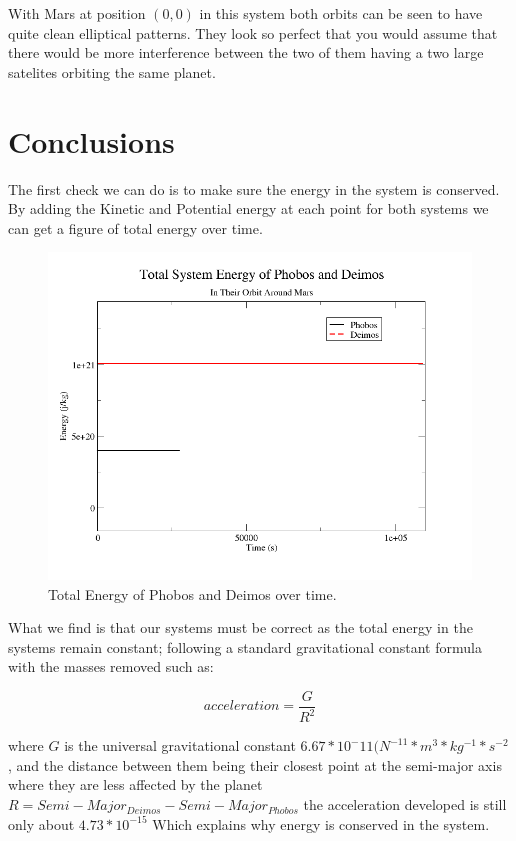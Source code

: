 \documentclass[11pt]{article}
\begin{document}
\noindent With Mars at position $(0,0)$ in this system both orbits can be seen to have quite clean elliptical patterns. They look so perfect that you would assume that there would be more interference between the two of them having a two large satelites orbiting the same planet.

\section{Conclusions}
\noindent  The first check we can do is to make sure the energy in the system is conserved. By adding the Kinetic and Potential energy at each point for both systems we can get a figure of total energy over time. 

\begin{figure}[ht]
\centering
\includegraphics[width=1.0\textwidth, angle =0]{../images/energy}
\caption{Total Energy of Phobos and Deimos over time.}
\label{fig:energy}
\end{figure}

\noindent What we find is that our systems must be correct as the total energy in the systems remain constant; following a standard gravitational constant formula with the masses removed such as:

\begin{equation}
\label{relGravity}
acceleration = \frac{G}{R^2}
\end{equation}

\noindent where $G$ is the universal gravitational constant $6.67*10^-11 (N^{-11}*m^{3}*kg^{-1}*s^{-2}$, and the distance between them being their closest point at the semi-major axis where they are less affected by the planet $R = Semi-Major_{Deimos}-Semi-Major_{Phobos}$ the acceleration developed is still only about $4.73*10^{-15}$ Which explains why energy is conserved in the system.
\end{document}

